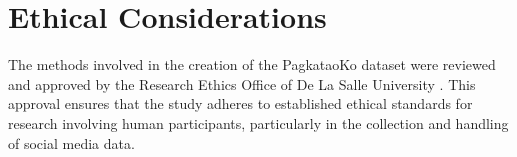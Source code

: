 


%
%

\section{Ethical Considerations}
\label{sec:Ethics}

The methods involved in the creation of the PagkataoKo dataset were reviewed and approved by the Research Ethics Office of De La Salle University \citep{tighe_acorda_2022}. This approval ensures that the study adheres to established ethical standards for research involving human participants, particularly in the collection and handling of social media data.

